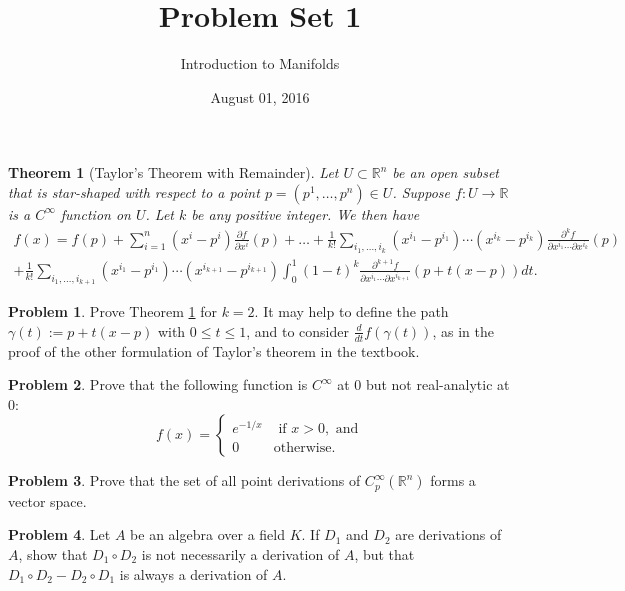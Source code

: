 \documentclass{amsart}
\newcommand{\+}[1]{\ensuremath{\mathbf{#1}}}
\newcommand{\R}{{\mathbb R}}
\newtheorem{thm}{Theorem}
\theoremstyle{definition}
\newtheorem{prob}{Problem}
\begin{document}
\title{Problem Set 1}
\date{August 01, 2016}
\author{Introduction to Manifolds}

\maketitle


\begin{framed}
\begin{thm}[Taylor's Theorem with Remainder]\label{T:complicated_taylor}
Let $U \subset \R^n$ be an open subset that is star-shaped with respect to a point $p = (p^1,\ldots,p^n) \in U$.
Suppose $f:U \to \R$ is a $C^\infty$ function on $U$.  Let $k$ be any positive integer.  We then have
\begin{align*}
f(x) = f(p) + \sum^n_{i=1} (x^i - p^i) \frac{\partial f}{\partial x^i} (p) + \ldots
+ \frac{1}{k!} \sum_{i_1,\ldots,i_k} (x^{i_1} - p^{i_1})\cdots(x^{i_k} - p^{i_k}) 
\frac{\partial^k f}{\partial x^{i_1} \cdots \partial x^{i_k}}(p) \\
+ {\frac{1}{k!}}\sum_{i_1,\ldots,i_{k+1}}(x^{i_1} - p^{i_1})\cdots(x^{i_{k+1}} - p^{i_{k+1}})\int^1_0 (1-t)^k 
\frac{\partial^{k+1} f}{\partial x^{i_1} \cdots \partial x^{i_{k+1}}}(p + t(x-p)) dt.
\end{align*}
\end{thm}
\end{framed}




\begin{prob}
Prove Theorem \ref{T:complicated_taylor} for $k = 2$.  It may help to define the
 path $\gamma(t) := p + t(x-p)$ with $0 \leq t \leq 1$, and to consider
 $\frac{d}{dt} f(\gamma(t))$, as in the proof of the other formulation of Taylor's theorem
 in the textbook.
\end{prob} 


\begin{prob}
 Prove that the following function is $C^\infty$ at $0$ but not real-analytic at $0$:
 \begin{equation*}
  f(x) =
  \begin{cases}
   e^{-1/x} &\text{ if } x > 0, \text{ and} \\
   0 &\text{otherwise}.
  \end{cases}
 \end{equation*}
\end{prob}

\begin{prob}
 Prove that the set of all point derivations of $C^{\infty}_p(\R^n)$ forms a vector space.
\end{prob}

\begin{prob}
Let $A$ be an algebra over a field $K$.  If $D_1$ and $D_2$ are derivations
of $A$, show that $D_1 \circ D_2$ is not necessarily a derivation of $A$, but that
$D_1 \circ D_2 - D_2 \circ D_1$ is always a derivation of $A$.
\end{prob}
\end{document}
